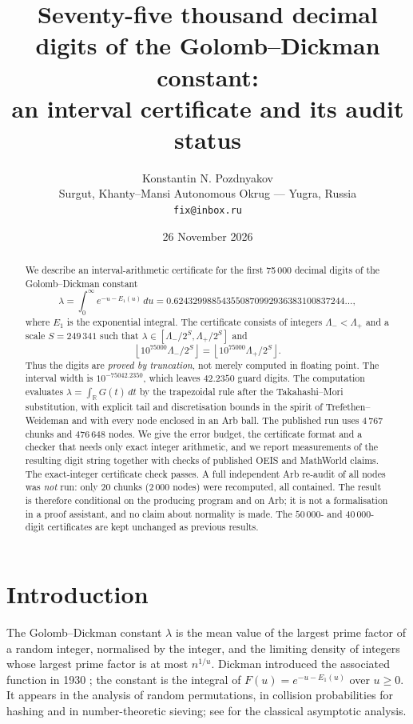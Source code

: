 \documentclass[11pt,a4paper]{article}
\title{Seventy-five thousand decimal digits of the Golomb--Dickman constant:\\
  an interval certificate and its audit status}
\author{Konstantin N. Pozdnyakov\\
\small Surgut, Khanty--Mansi Autonomous Okrug --- Yugra, Russia\\
\small \texttt{fix@inbox.ru}}
\date{26 November 2026}
\theoremstyle{remark}
\newcommand{\Eone}{E_1}
\newcommand{\lam}{\lambda}
\newcommand{\R}{\mathbb{R}}
\newcommand{\floor}[1]{\left\lfloor #1 \right\rfloor}
\begin{document}
\maketitle

\begin{abstract}
We describe an interval-arithmetic certificate for the first
75\,000 decimal digits of the Golomb--Dickman constant
\[
  \lam=\int_0^\infty e^{-u-\Eone(u)}\,du
      =0.624329988543550870992936383100837244\ldots,
\]
where $\Eone$ is the exponential integral. The certificate consists of
integers $\Lambda_-<\Lambda_+$ and a scale $S=249\,341$ such that
$\lam\in[\Lambda_-/2^S,\Lambda_+/2^S]$ and
\[
  \floor{10^{75000}\Lambda_-/2^S}
  =\floor{10^{75000}\Lambda_+/2^S}.
\]
Thus the digits are \emph{proved by truncation}, not merely computed in
floating point. The interval width is $10^{-75042.2350}$, which leaves
$42.2350$ guard digits. The computation evaluates
$\lam=\int_{\R}G(t)\,dt$ by the trapezoidal rule after the
Takahashi--Mori substitution, with explicit tail and discretisation bounds
in the spirit of Trefethen--Weideman and with every node enclosed in an Arb
ball. The published run uses $4\,767$ chunks and $476\,648$ nodes. We give
the error budget, the certificate format and a checker that needs only
exact integer arithmetic, and we report measurements of the resulting digit
string together with checks of published OEIS and MathWorld claims.
The exact-integer certificate check passes. A full independent Arb re-audit
of all nodes was \emph{not} run: only $20$ chunks ($2\,000$ nodes) were
recomputed, all contained. The result is therefore conditional on the
producing program and on Arb; it is not a formalisation in a proof
assistant, and no claim about normality is made. The $50\,000$- and
$40\,000$-digit certificates are kept unchanged as previous results.
\end{abstract}

\tableofcontents

\section{Introduction}

The Golomb--Dickman constant $\lam$ is the mean value of the largest
prime factor of a random integer, normalised by the integer, and the
limiting density of integers whose largest prime factor is at most
$n^{1/u}$. Dickman introduced the associated function in 1930
\cite{dickman1930}; the constant is the integral of
$F(u)=e^{-u-\Eone(u)}$ over $u\ge0$. It appears in the analysis of
random permutations, in collision probabilities for hashing and in
number-theoretic sieving; see \cite{debruijn1951} for the classical
asymptotic analysis.
\end{document}

